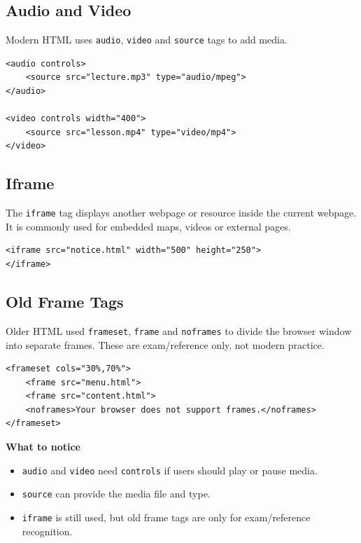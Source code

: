 \subsection{Audio and Video}
Modern HTML uses \texttt{audio}, \texttt{video} and \texttt{source} tags to add media.

\begin{lstlisting}[style=htmlide, caption={Audio and Video Example}]
<audio controls>
    <source src="lecture.mp3" type="audio/mpeg">
</audio>

<video controls width="400">
    <source src="lesson.mp4" type="video/mp4">
</video>
\end{lstlisting}

\subsection{Iframe}
The \texttt{iframe} tag displays another webpage or resource inside the current webpage. It is commonly used for embedded maps, videos or external pages.

\begin{lstlisting}[style=htmlide, caption={Iframe Example}]
<iframe src="notice.html" width="500" height="250">
</iframe>
\end{lstlisting}

\subsection{Old Frame Tags}
Older HTML used \texttt{frameset}, \texttt{frame} and \texttt{noframes} to divide the browser window into separate frames. These are exam/reference only, not modern practice.

\begin{lstlisting}[style=htmlide, caption={Old Frameset Example}]
<frameset cols="30%,70%">
    <frame src="menu.html">
    <frame src="content.html">
    <noframes>Your browser does not support frames.</noframes>
</frameset>
\end{lstlisting}

\textbf{What to notice}
\begin{itemize}
    \item \texttt{audio} and \texttt{video} need \texttt{controls} if users should play or pause media.
    \item \texttt{source} can provide the media file and type.
    \item \texttt{iframe} is still used, but old frame tags are only for exam/reference recognition.
\end{itemize}

